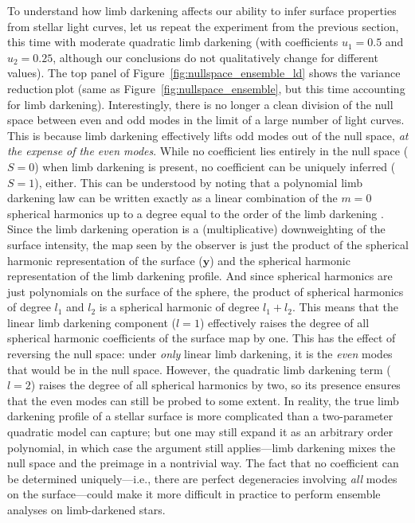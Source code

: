 \documentclass[modern]{aastex62}
\newcommand{\shrinkage}{{variance reduction\,}}
\begin{document}
To understand how limb darkening affects our ability to infer
surface properties from stellar light curves,
let us repeat the experiment from the previous section,
this time with moderate quadratic limb darkening (with coefficients
$u_1 = 0.5$ and $u_2 = 0.25$, although our conclusions do not
qualitatively change for different values).
The top panel of Figure~\ref{fig:nullspace_ensemble_ld} shows the
\shrinkage plot (same as Figure~\ref{fig:nullspace_ensemble}, but
this time accounting for limb darkening). Interestingly, there is no longer a clean division of
the null space between even and odd modes in the limit of a large number
of light curves.
This is because limb darkening effectively lifts odd modes out of the null space, \emph{at the
    expense of the even modes}. While no coefficient lies entirely in the
null space ($S = 0$) when limb darkening is present, no coefficient
can be uniquely inferred ($S = 1$), either. This can be understood by noting that
a polynomial limb darkening law can be written
exactly as a linear combination of the $m=0$ spherical harmonics
up to a degree equal to the order of the limb darkening
\citep[in this case, $l = 2$;]{Luger2019,Agol2020}.
Since the limb darkening operation is a (multiplicative) downweighting of
the surface intensity, the map seen by the observer is just the product
of the spherical harmonic representation of the surface ($\mathbf{y}$)
and the spherical harmonic representation of the limb darkening profile.
And since spherical harmonics are just polynomials on the surface of the sphere,
the product of spherical harmonics of degree $l_1$ and $l_2$ is a spherical
harmonic of degree $l_1 + l_2$. This means that the linear limb darkening
component ($l = 1$) effectively raises the degree of all spherical harmonic
coefficients of the surface map by one. This has the effect of reversing
the null space: under \emph{only} linear limb darkening, it is the \emph{even}
modes that would be in the null space. However, the quadratic
limb darkening term ($l = 2$) raises the degree of all spherical harmonics by two,
so its presence ensures that the even modes can still be probed to some extent.
In reality, the true limb darkening profile of a stellar surface is more
complicated than a two-parameter quadratic model can capture; but one may still
expand it as an arbitrary order polynomial, in which case the argument still
applies---limb darkening mixes the null space and the preimage in a nontrivial
way.
%
The fact that no coefficient can be determined uniquely---i.e., there are
perfect degeneracies involving \emph{all} modes on the surface---could make it more
difficult in practice to perform ensemble analyses on limb-darkened stars.
\end{document}
